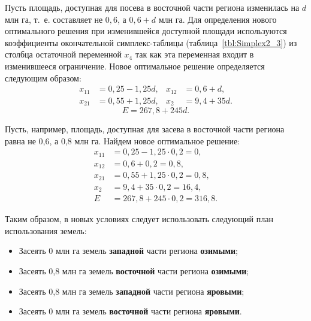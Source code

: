 Пусть площадь, доступная для посева в восточной части региона изменилась на
$ d $ млн га, т.~е. составляет не $ 0{,}6 $, а $ 0{,}6 + d $ млн га. 
Для определения нового оптимального решения при изменившейся доступной площади
используются коэффициенты окончательной симплекс-таблицы (таблица~\ref{tbl:Simplex2_3})
из столбца остаточной переменной $ x_{4} $ так как эта переменная входит в изменившееся ограничение.
Новое оптимальное решение определяется следующим образом:
\begin{equation}
  \label{eq:Analisys_1m}
  \begin{aligned}
    x_{11} &= 0{,}25 - 1{,}25d, &
    x_{12} &= 0{,}6 + d, \\
    x_{21} &= 0{,}55 + 1{,}25d, &
    x_{2} &= 9{,}4 + 35d.
  \end{aligned}
\end{equation}
\begin{equation}
  E = 267{,}8 + 245d.
\end{equation}

Пусть, например, площадь, доступная для засева в восточной части региона равна не 0{,}6, а 0{,}8 млн га.
Найдем новое оптимальное решение: 
\begin{equation}
    \begin{aligned}
      x_{11} &= 0{,}25 - 1{,}25 \cdot 0{,}2 = 0, \\
      x_{12} &= 0{,}6 + 0{,}2 = 0{,}8, \\
      x_{21} &= 0{,}55 + 1{,}25 \cdot 0{,}2 = 0{,}8, \\
      x_{2} &= 9{,}4 + 35 \cdot 0{,}2 = 16{,}4, \\
      E &= 267{,}8 + 245 \cdot 0{,}2 = 316{,}8.
    \end{aligned}
\end{equation}

Таким образом, в новых условиях следует использовать следующий план использования земель:
\begin{itemize}
\item Засеять 0 млн га земель \textbf{западной} части региона \textbf{озимыми};
\item Засеять 0{,}8 млн га земель \textbf{восточной} части региона \textbf{озимыми};
\item Засеять 0{,}8 млн га земель \textbf{западной} части региона \textbf{яровыми};
\item Засеять 0 млн га земель \textbf{восточной} части региона \textbf{яровыми}.
\end{itemize}

